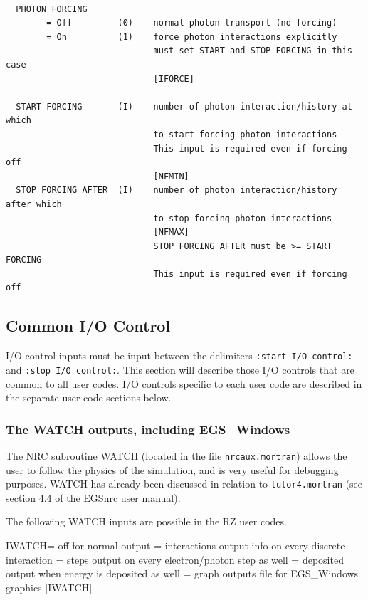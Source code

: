 \documentclass[12pt,twoside]{article}  %
\begin{document}
\begin{verbatim}

  PHOTON FORCING
        = Off         (0)    normal photon transport (no forcing)
        = On          (1)    force photon interactions explicitly
                             must set START and STOP FORCING in this case
                             [IFORCE]

  START FORCING       (I)    number of photon interaction/history at which
                             to start forcing photon interactions
                             This input is required even if forcing off
                             [NFMIN]
  STOP FORCING AFTER  (I)    number of photon interaction/history after which
                             to stop forcing photon interactions
                             [NFMAX]
                             STOP FORCING AFTER must be >= START FORCING
                             This input is required even if forcing off

\end{verbatim}

\subsection{Common I/O Control}
\label{common_I_O_control}

I/O control inputs must be input between the delimiters
{\tt :start I/O control:} and {\tt :stop I/O control:}.  This section
will describe those I/O controls that are common to all user codes.
I/O controls specific to each user code are described in the separate
user code sections below.

\subsubsection[WATCH \& EGS\_Windows]{The WATCH outputs, including EGS\_Windows}
\label{watch}

The NRC subroutine WATCH (located in the file \verb+nrcaux.mortran+)
allows the user to follow the physics of the
simulation, and is very useful for debugging purposes. WATCH
has already been discussed in relation to \verb+tutor4.mortran+
(see section 4.4 of the EGSnrc user manual\cite{KR00}).

The following WATCH inputs are possible in the RZ user codes.
\begin{center}
\begin{boxedverbatim}

  IWATCH= off            for normal output
        = interactions   output info on every discrete interaction
        = steps          output on every electron/photon step as well
        = deposited      output when energy is deposited as well
        = graph          outputs file for EGS_Windows graphics
                         [IWATCH]

\end{boxedverbatim}
\end{center}
\end{document}

